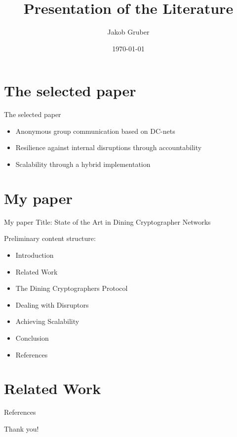 \documentclass[]{beamer} %
\title{Presentation of the Literature}
\author{Jakob Gruber}
\date{\today}
\begin{document}
\maketitle

\section{The selected paper}

\begin{frame}{The selected paper}
    
    \begin{itemize}
        \item Anonymous group communication based on DC-nets
        \item Resilience against internal disruptions through accountability
        \item Scalability through a hybrid implementation
    \end{itemize}
\end{frame}

\section{My paper}

\begin{frame}{My paper}
    Title: State of the Art in Dining Cryptographer Networks
    
    Preliminary content structure:
    \begin{itemize}
        \item Introduction
        \item Related Work
        \item The Dining Cryptographers Protocol
        \item Dealing with Disruptors
        \item Achieving Scalability
        \item Conclusion
        \item [] References
    \end{itemize}
\end{frame}

\section{Related Work}

\begin{frame}[allowframebreaks]{References}
    \nocite{journals/joc/Chaum88}
    \nocite{conf/eurocrypt/GolleJ04}
    \nocite{journals/corr/abs-1004-3057}
    \nocite{von2003k}
    \nocite{goel2003herbivore}
    \nocite{bos1990detection}
    \nocite{waidner1989dining}
    \nocite{danezis2008survey}
    \nocite{journals/cacm/Chaum81}
    \nocite{conf/uss/DingledineMS04}
    \printbibliography
\end{frame}

\begin{titleframe}
    \begin{center}
    \alert{\Large Thank you!}
    \end{center}
\end{titleframe}
\end{document}
